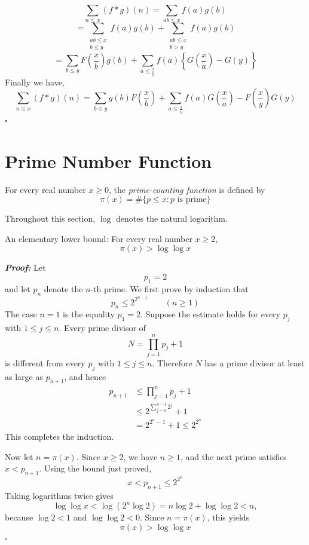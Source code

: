 \documentclass[a4paper,11pt,abstracton]{scrartcl}
\theoremstyle{dotlessP}
\theoremstyle{dotlessS}
\theoremstyle{remark}
\theoremstyle{definition}
\begin{document}
\begin{claim_box}
$$\sum_{n \le x}(f*g)(n) = \sum_{ab \le x}f(a)g(b)$$
$$=\sum_{\substack{ab \le x \\ b \le y}}f(a)g(b)+\sum_{\substack{ab \le x \\ b > y}}f(a)g(b)$$
$$=\sum_{b \le y}F(\frac{x}{b})g(b)+\sum_{a \le \frac{x}{y}}f(a)\left\{G(\frac{x}{a})-G(y)\right\}$$
Finally we have,
$$\sum_{n \le x}(f*g)(n) = \sum_{b \le y}g(b)F(\frac{x}{b})+\sum_{a \le \frac{x}{y}}f(a)G(\frac{x}{a})-F(\frac{x}{y})G(y)$$
\hfill$\square$
\end{claim_box}

\section{Prime Number Function}

\begin{definition_box}
For every real number $x\geq0$, the \emph{prime-counting function} is
defined by
\[
    \pi(x)=\#\{p\leq x:p\text{ is prime}\}
\]
\end{definition_box}

Throughout this section, $\log$ denotes the natural logarithm.

\begin{mainbox}{An elementary lower bound:}
For every real number $x\geq2$,
\[
    \pi(x)>\log\log x
\]
\end{mainbox}

\begin{claim_box}
\textbf{\textit{Proof:}}
Let
\[
    p_1=2
\]
and let $p_n$ denote the $n$-th prime. We first prove by induction that
\[
    p_n\leq2^{2^{n-1}}\qquad(n\geq1)
\]
The case $n=1$ is the equality $p_1=2$. Suppose the estimate holds
for every $p_j$ with $1\leq j\leq n$. Every prime divisor of
\[
    N=\prod_{j=1}^{n}p_j+1
\]
is different from every $p_j$ with $1\leq j\leq n$. Therefore $N$ has a prime divisor
at least as large as $p_{n+1}$, and hence
\begin{align*}
    p_{n+1}
      &\leq \prod_{j=1}^{n}p_j+1\\
      &\leq 2^{\sum_{j=0}^{n-1}2^j}+1\\
      &=2^{2^n-1}+1
       \leq2^{2^n}
\end{align*}
This completes the induction.

Now let $n=\pi(x)$. Since $x\geq2$, we have $n\geq1$, and the next
prime satisfies $x<p_{n+1}$. Using the bound just proved,
\[
    x<p_{n+1}\leq2^{2^n}
\]
Taking logarithms twice gives
\[
    \log\log x
      <\log(2^n\log2)
      =n\log2+\log\log2
      <n,
\]
because $\log2<1$ and $\log\log2<0$. Since $n=\pi(x)$, this yields
\[
    \pi(x)>\log\log x
\]
\hfill$\square$
\end{claim_box}
\end{document}
